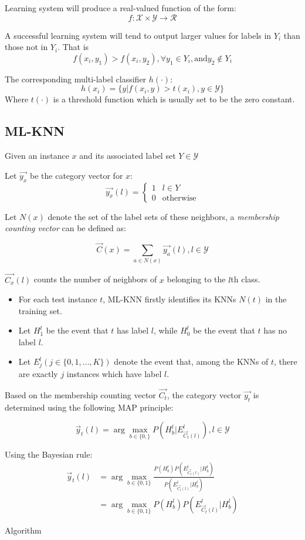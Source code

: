 Learning system will produce a real-valued function of the form:
\[ f: \mathcal{X} \times \mathcal{Y} \rightarrow \mathcal{R}\]

A successful learning system will tend to output larger values for labels
in $Y_i$ than those not in $Y_i$. That is
\[ f(x_i, y_1) > f(x_i, y_2), \forall y_1 \in Y_i, \mbox{and} y_2 \not\in
Y_i\]

The corresponding multi-label classifier $h(\cdot)$:
\[ h(x_i) = \{ y|f(x_i, y) > t(x_i), y \in \mathcal{Y}\}\]
Where $t(\cdot)$ is a threshold function which is usually set to be the
zero constant.

\subsection{ML-KNN}

Given an instance $x$ and its associated label set $Y\in \mathcal{Y}$

Let $\vec{y_x}$ be the category vector for $x$:
\[
    \vec{y_x}(l) = 
    \begin{cases}
    1 & l \in Y \\
    0 & \mbox{otherwise}
    \end{cases}
\]

Let $N(x)$ denote the set of the label sets of these neighbors, a
\emph{membership counting vector} can be defined as:

\[ \vec{C}(x) = \sum_{a \in N(x)}\vec{y_a}(l), l \in \mathcal{Y}\]

$\vec{C_x}(l)$ counts the number of neighbors of $x$ belonging to the
$l$th class.

\begin{itemize}
    \item  For each test instance $t$, ML-KNN firstly identifies its KNNs $N(t)$ in
        the training set.
    \item Let $H_1^l$ be the event that $t$ has label $l$, while $H_0^l$
        be the event that $t$ has no label $l$.
    \item Let $E_j^l (j \in \{0, 1, \dots, K\})$ denote the event that,
        among the KNNs of $t$, there are exactly $j$ instances which have
        label $l$. 
\end{itemize}

Based on the membership counting vector $\vec{C_t}$, the category vector
$\vec{y_t}$ is determined using the following MAP principle:

\[ 
    \vec{y}_t(l) = \arg\max_{b\in \{0, \}} P(H_b^l|E_{\vec{C}_t(l)}^l), l
    \in \mathcal{Y}
\]

Using the Bayesian rule:
\begin{align*}
    \vec{y}_t(l) &= \arg\max_{b\in \{0, 1\}} \frac{P(H_b^l)
        P(E^l_{\vec{C}_t(l)}|H_b^l)}{P(E_{\vec{C}_t(l)}^l|H_b^l)} \\
        &= \arg\max_{b \in \{0, 1\}} P(H_b^l)P(E_{\vec{C}_t(l)}^l|H_b^l)
\end{align*}

Algorithm

